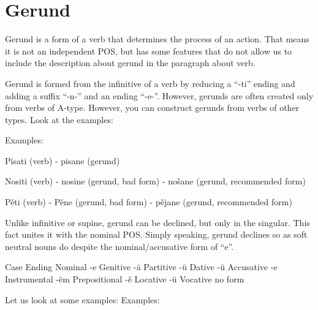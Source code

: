 \section{Gerund}

Gerund is a form of a verb that determines the process of an action. That means it is not an independent POS, but has some features that do not allow us to include the description about gerund in the paragraph about verb.

Gerund is formed from the infinitive of a verb by reducing a “-ti” ending and adding a suffix “-n-” and an ending “-e-”. However, gerunds are often created only from verbs of A-type. However, you can construct gerunds from verbs of other types. Look at the examples:

Examples:

Pisati (verb) - pisane (gerund)

Nositi (verb) - nosine (gerund, bad form) - nošane (gerund, recommended form)

Pěti (verb) - Pěne (gerund, bad form) - pějane (gerund, recommended form)

Unlike infinitive or supine, gerund can be declined, but only in the singular. This fact unites it with the nominal POS. Simply speaking, gerund declines so as soft neutral nouns do despite the nominal/accusative form of “e”.

Case
Ending
Nominal
-e
Genitive
-ä
Partitive
-ü
Dative
-ü
Accusative
-e
Instrumental
-ëm
Prepositional
-ě
Locative
-ü
Vocative
no form

Let us look at some examples:
Examples:


